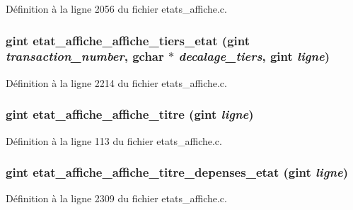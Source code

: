 Définition à la ligne 2056 du fichier etats\_\-affiche.c.

\subsubsection[{etat\_\-affiche\_\-affiche\_\-tiers\_\-etat}]{\setlength{\rightskip}{0pt plus 5cm}gint etat\_\-affiche\_\-affiche\_\-tiers\_\-etat (gint {\em transaction\_\-number}, \/  gchar $\ast$ {\em decalage\_\-tiers}, \/  gint {\em ligne})}\label{etats__affiche_8c_aac3474fdf470273303bec55a54b25ca5}


Définition à la ligne 2214 du fichier etats\_\-affiche.c.

\subsubsection[{etat\_\-affiche\_\-affiche\_\-titre}]{\setlength{\rightskip}{0pt plus 5cm}gint etat\_\-affiche\_\-affiche\_\-titre (gint {\em ligne})}\label{etats__affiche_8c_a23d532904e268d1992c339aeecfb35bd}


Définition à la ligne 113 du fichier etats\_\-affiche.c.

\subsubsection[{etat\_\-affiche\_\-affiche\_\-titre\_\-depenses\_\-etat}]{\setlength{\rightskip}{0pt plus 5cm}gint etat\_\-affiche\_\-affiche\_\-titre\_\-depenses\_\-etat (gint {\em ligne})}\label{etats__affiche_8c_a184381e9870a9e98e164a74df418678f}


Définition à la ligne 2309 du fichier etats\_\-affiche.c.


